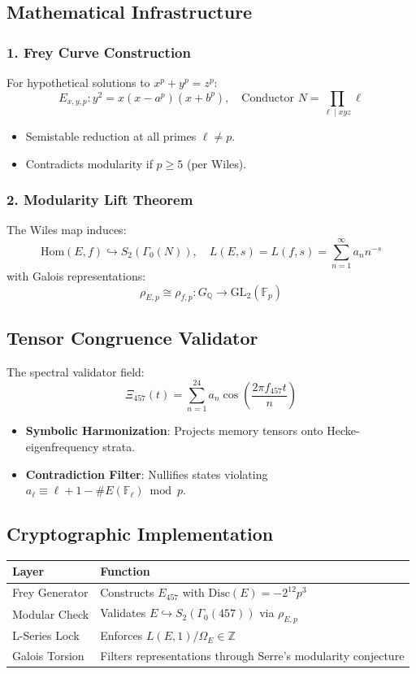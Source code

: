 \documentclass[12pt]{article}
\begin{document}
\subsection*{Mathematical Infrastructure}
\subsubsection*{1. Frey Curve Construction}
For hypothetical solutions to $x^p + y^p = z^p$:
\[
E_{x,y,p}: y^2 = x(x - a^p)(x + b^p), \quad \text{Conductor } N = \prod_{\ell \mid xyz} \ell
\]
\begin{itemize}
    \item Semistable reduction at all primes $\ell \neq p$.
    \item Contradicts modularity if $p \geq 5$ (per Wiles).
\end{itemize}

\subsubsection*{2. Modularity Lift Theorem}
The Wiles map induces:
\[
\mathrm{Hom}(E, f) \hookrightarrow S_2(\Gamma_0(N)), \quad L(E,s) = L(f,s) = \sum_{n=1}^\infty a_n n^{-s}
\]
with Galois representations:
\[
\rho_{E,p} \cong \rho_{f,p}: G_\mathbb{Q} \to \mathrm{GL}_2(\mathbb{F}_p)
\]

\subsection*{Tensor Congruence Validator}
The spectral validator field:
\[
\Xi_{457}(t) = \sum_{n=1}^{24} a_n \cos\left(\frac{2\pi f_{457} t}{n}\right)
\]
\begin{itemize}
    \item \textbf{Symbolic Harmonization}: Projects memory tensors onto Hecke-eigenfrequency strata.
    \item \textbf{Contradiction Filter}: Nullifies states violating $a_\ell \equiv \ell + 1 - \#E(\mathbb{F}_\ell) \bmod p$.
\end{itemize}

\subsection*{Cryptographic Implementation}
\begin{table}[h]
\centering
\begin{tabular}{ll}
\toprule
\textbf{Layer} & \textbf{Function} \\
\midrule
Frey Generator & Constructs $E_{457}$ with $\mathrm{Disc}(E) = -2^{12}p^3$ \\
Modular Check & Validates $E \hookrightarrow S_2(\Gamma_0(457))$ via $\rho_{E,p}$ \\
L-Series Lock & Enforces $L(E,1)/\Omega_E \in \mathbb{Z}$ \\
Galois Torsion & Filters representations through Serre's modularity conjecture \\
\bottomrule
\end{tabular}
\end{table}
\end{document}
